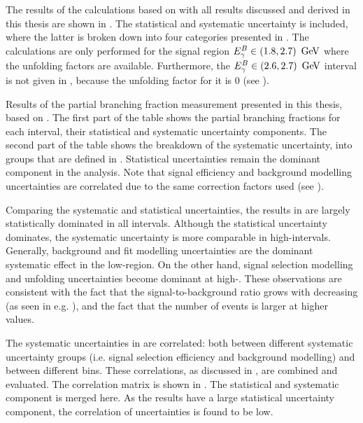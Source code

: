 The results of the calculations based on  with all 
results discussed and derived in this thesis are shown in .
The statistical and systematic uncertainty is included, where the latter is broken down into four categories presented in .
The calculations are only performed for the signal region ${E^B_{\gamma}}\in(1.8,2.7)~\mathrm{\,Ge\kern -0.1em V}$ where the unfolding factors are available.
Furthermore, the ${E^B_{\gamma}}\in(2.6,2.7)~\mathrm{\,Ge\kern -0.1em V}$ interval is not given in , 
because the unfolding factor for it is 0 (see ).

\begin{table}[htbp!]
    \centering
    \caption{\label{tab:partial_branching_fractions}
    Results of the partial branching fraction measurement presented in this thesis, based on . 
    The first part of the table shows the partial branching fractions for each \EB interval, their statistical and systematic uncertainty components.
    The second part of the table shows the breakdown of the systematic uncertainty, into groups that are defined in . 
    Statistical uncertainties remain the dominant component in the analysis.
    Note that signal efficiency and background modelling uncertainties are correlated due to the same correction factors used (see ).
    }
    
\end{table}

Comparing the systematic and statistical uncertainties, the results in  
are largely statistically dominated in all \EB intervals.
Although the statistical uncertainty dominates, the systematic uncertainty is more comparable in high-\EB intervals.
Generally, background and fit modelling uncertainties are the dominant systematic effect in the low-\EB region.
On the other hand, signal selection modelling and unfolding uncertainties become dominant at high-\EB.
These observations are consistent with the fact that the signal-to-background ratio grows with decreasing \EB (as seen in e.g. ),
and the fact that the number of \BtoXsgamma events is larger at higher \EB values.

The systematic uncertainties in  are correlated:
both between different systematic uncertainty groups (i.e. signal selection efficiency and background modelling)
and between different \EB bins.
These correlations, as discussed in , are combined and evaluated.
The correlation matrix is shown in .
The statistical and systematic component is merged here.
As the results have a large statistical uncertainty component, the correlation of uncertainties is found to be low.

